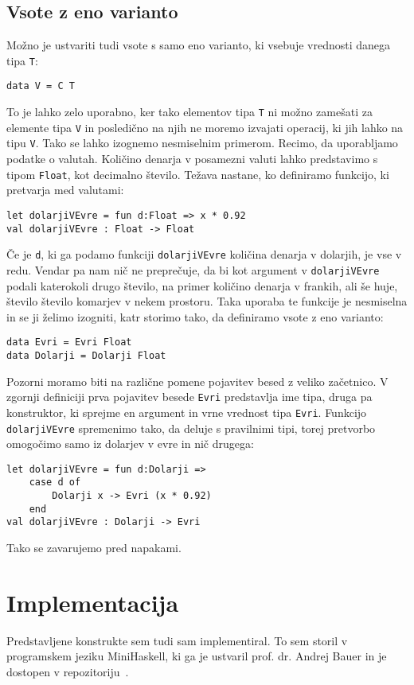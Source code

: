 \documentclass[12pt,a4paper,openany]{book}
\begin{document}
\section{Vsote z eno varianto}
Možno je ustvariti tudi vsote s samo eno varianto, ki vsebuje vrednosti danega tipa \lstinline{T}:
\begin{lstlisting}
data V = C T
\end{lstlisting}
To je lahko zelo uporabno, ker tako elementov tipa \lstinline{T} ni možno zamešati za elemente tipa \lstinline{V} in posledično na njih ne moremo izvajati operacij, ki jih lahko na tipu 
\lstinline{V}. Tako se lahko izognemo nesmiselnim primerom. Recimo, da uporabljamo podatke o valutah. Količino denarja v posamezni valuti lahko predstavimo s tipom \lstinline{Float}, kot decimalno 
število. Težava nastane, ko definiramo funkcijo, ki pretvarja med valutami:
\begin{lstlisting}
let dolarjiVEvre = fun d:Float => x * 0.92
val dolarjiVEvre : Float -> Float
\end{lstlisting}
Če je \lstinline{d}, ki ga podamo funkciji \lstinline{dolarjiVEvre} količina denarja v dolarjih, je vse v redu. Vendar pa nam nič ne 
preprečuje, da bi kot argument v \lstinline{dolarjiVEvre} podali katerokoli drugo število, na primer količino denarja v frankih, ali še huje, število število komarjev v nekem prostoru. Taka uporaba te 
funkcije je nesmiselna in se ji želimo izogniti, katr storimo tako, da definiramo vsote z eno varianto:
\begin{lstlisting}
data Evri = Evri Float
data Dolarji = Dolarji Float
\end{lstlisting}
Pozorni moramo biti na različne pomene pojavitev besed z veliko začetnico. V zgornji definiciji prva pojavitev besede \lstinline{Evri} predstavlja ime tipa, druga pa konstruktor, ki sprejme en argument in 
vrne vrednost tipa \lstinline{Evri}.
Funkcijo \lstinline{dolarjiVEvre} spremenimo tako, da deluje s pravilnimi tipi, torej pretvorbo omogočimo 
samo iz dolarjev v evre in nič drugega:
\begin{lstlisting}
let dolarjiVEvre = fun d:Dolarji =>
    case d of 
        Dolarji x -> Evri (x * 0.92)
    end
val dolarjiVEvre : Dolarji -> Evri
\end{lstlisting}
Tako se zavarujemo pred napakami.
\newpage

\chapter{Implementacija}
Predstavljene konstrukte sem tudi sam implementiral. To sem storil v programskem jeziku MiniHaskell, ki ga je ustvaril prof. dr. Andrej Bauer in 
je dostopen v repozitoriju~\cite{bauer:plzoo}.
\end{document}
